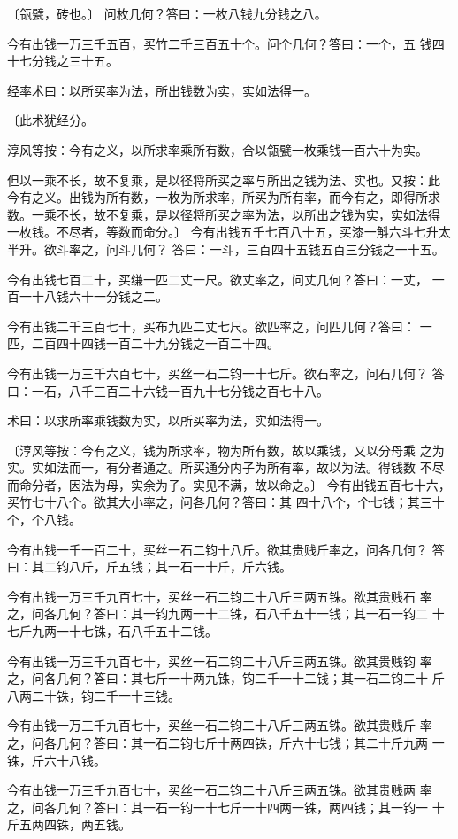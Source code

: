 \documentclass[a4paper,12pt,UTF8,twoside]{ctexbook}
\begin{document}
〔瓴甓，砖也。〕 问枚几何？答曰：一枚八钱九分钱之八。

今有出钱一万三千五百，买竹二千三百五十个。问个几何？答曰：一个，五 钱四十七分钱之三十五。

经率术曰：以所买率为法，所出钱数为实，实如法得一。

〔此术犹经分。

淳风等按：今有之义，以所求率乘所有数，合以瓴甓一枚乘钱一百六十为实。

但以一乘不长，故不复乘，是以径将所买之率与所出之钱为法、实也。又按：此 今有之义。出钱为所有数，一枚为所求率，所买为所有率，而今有之，即得所求 数。一乘不长，故不复乘，是以径将所买之率为法，以所出之钱为实，实如法得 一枚钱。不尽者，等数而命分。〕 今有出钱五千七百八十五，买漆一斛六斗七升太半升。欲斗率之，问斗几何？ 答曰：一斗，三百四十五钱五百三分钱之一十五。

今有出钱七百二十，买缣一匹二丈一尺。欲丈率之，问丈几何？答曰：一丈， 一百一十八钱六十一分钱之二。

今有出钱二千三百七十，买布九匹二丈七尺。欲匹率之，问匹几何？答曰： 一匹，二百四十四钱一百二十九分钱之一百二十四。

今有出钱一万三千六百七十，买丝一石二钧一十七斤。欲石率之，问石几何？ 答曰：一石，八千三百二十六钱一百九十七分钱之百七十八。

术曰：以求所率乘钱数为实，以所买率为法，实如法得一。

〔淳风等按：今有之义，钱为所求率，物为所有数，故以乘钱，又以分母乘 之为实。实如法而一，有分者通之。所买通分内子为所有率，故以为法。得钱数 不尽而命分者，因法为母，实余为子。实见不满，故以命之。〕 今有出钱五百七十六，买竹七十八个。欲其大小率之，问各几何？答曰：其 四十八个，个七钱；其三十个，个八钱。

今有出钱一千一百二十，买丝一石二钧十八斤。欲其贵贱斤率之，问各几何？ 答曰：其二钧八斤，斤五钱；其一石一十斤，斤六钱。

今有出钱一万三千九百七十，买丝一石二钧二十八斤三两五铢。欲其贵贱石 率之，问各几何？答曰：其一钧九两一十二铢，石八千五十一钱；其一石一钧二 十七斤九两一十七铢，石八千五十二钱。

今有出钱一万三千九百七十，买丝一石二钧二十八斤三两五铢。欲其贵贱钧 率之，问各几何？答曰：其七斤一十两九铢，钧二千一十二钱；其一石二钧二十 斤八两二十铢，钧二千一十三钱。

今有出钱一万三千九百七十，买丝一石二钧二十八斤三两五铢。欲其贵贱斤 率之，问各几何？答曰：其一石二钧七斤十两四铢，斤六十七钱；其二十斤九两 一铢，斤六十八钱。

今有出钱一万三千九百七十，买丝一石二钧二十八斤三两五铢。欲其贵贱两 率之，问各几何？答曰：其一石一钧一十七斤一十四两一铢，两四钱；其一钧一 十斤五两四铢，两五钱。
\end{document}
